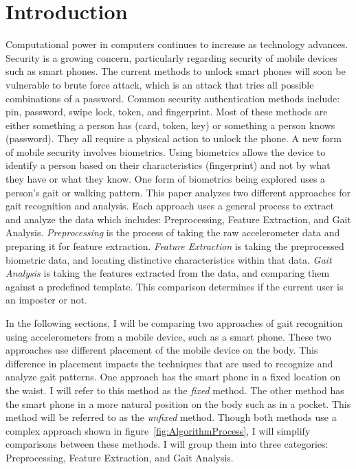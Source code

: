 \documentclass{sig-alternate}
\begin{document}
\section{Introduction}
	Computational power in computers continues to increase as technology advances. Security is a growing concern, particularly regarding security of mobile devices such as smart phones. The current methods to unlock smart phones will soon be vulnerable to brute force  attack, which is an attack that tries all possible combinations of a password. Common security authentication methods include: pin, password, swipe lock, token, and fingerprint. Most of these methods are either something a person has (card, token, key) or something a person knows (password). They all require a physical action to unlock the phone. A new form of mobile security involves biometrics. Using biometrics allows the device to identify a person based on their characteristics (fingerprint) and not by what they have or what they know. One form of biometrics being explored uses a person's gait or walking pattern. 
	This paper analyzes two different approaches for gait recognition and analysis. Each approach uses a general process to extract and analyze the data which includes: Preprocessing, Feature Extraction, and Gait Analysis. \textit{Preprocessing} is the process of taking the raw accelerometer data and preparing it for feature extraction. \textit{Feature Extraction} is taking the preprocessed biometric data, and locating distinctive characteristics within that data. \textit{Gait Analysis} is taking the features extracted from the data, and comparing them against a predefined template. This comparison determines if the current user is an imposter or not.

	In the following sections, I will be comparing two approaches of gait recognition using accelerometers from a mobile device, such as a smart phone. These two approaches use different placement of the mobile device on the body. This difference in placement impacts the techniques that are used to recognize and analyze gait patterns. One approach has the smart phone in a fixed location on the waist. I will refer to this method as the \textit{fixed} method. The other method has the smart phone in a more natural position on the body such as in a pocket. This method will be referred to as the \textit{unfixed} method. Though both methods use a complex approach shown in figure~\ref{fig:AlgorithmProcess}, I will simplify comparisons between these methods. I will group them into three categories: Preprocessing, Feature Extraction, and Gait Analysis. 
	
\end{document}
